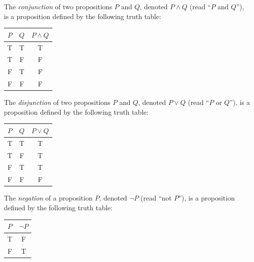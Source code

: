 \documentclass[../ium.tex]{subfiles}
\begin{document}
\begin{definition}
\begin{shaded*}
The \textit{conjunction} of two propositions $P$ and $Q$, denoted $P \land Q$ (read ``$P$ and $Q$''), is a proposition defined by the following truth table:
\begin{center}
\begin{tabular}{cc|c}
$P$ & $Q$ & $P \land Q$ \\
\hline
T & T & T \\
T & F & F \\
F & T & F \\
F & F & F
\end{tabular}
\end{center}
\end{shaded*}
\end{definition}

\begin{definition}
\begin{shaded*}
The \textit{disjunction} of two propositions $P$ and $Q$, denoted $P \lor Q$ (read ``$P$ or $Q$''), is a proposition defined by the following truth table:
\begin{center}
\begin{tabular}{cc|c}
$P$ & $Q$ & $P \lor Q$ \\
\hline
T & T & T \\
T & F & T \\
F & T & T \\
F & F & F
\end{tabular}
\end{center}
\end{shaded*}
\end{definition}

\begin{definition}
\begin{shaded*}
The \textit{negation} of a proposition $P$, denoted $\neg P$ (read ``not $P$''), is a proposition defined by the following truth table:
\begin{center}
\begin{tabular}{c|c}
$P$ & $\neg P$ \\
\hline
T & F \\
F & T
\end{tabular}
\end{center}
\end{shaded*}
\end{definition}
\end{document}
